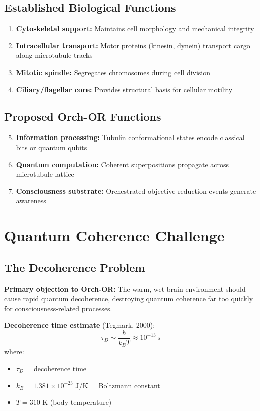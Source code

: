 \subsection{Established Biological Functions}

\begin{enumerate}
\item \textbf{Cytoskeletal support:} Maintains cell morphology and mechanical integrity
\item \textbf{Intracellular transport:} Motor proteins (kinesin, dynein) transport cargo along microtubule tracks
\item \textbf{Mitotic spindle:} Segregates chromosomes during cell division
\item \textbf{Ciliary/flagellar core:} Provides structural basis for cellular motility
\end{enumerate}

\subsection{Proposed Orch-OR Functions}

\begin{enumerate}
\setcounter{enumi}{4}
\item \textbf{Information processing:} Tubulin conformational states encode classical bits or quantum qubits
\item \textbf{Quantum computation:} Coherent superpositions propagate across microtubule lattice
\item \textbf{Consciousness substrate:} Orchestrated objective reduction events generate awareness
\end{enumerate}

\section{Quantum Coherence Challenge}

\subsection{The Decoherence Problem}

\begin{warningbox}
\textbf{Primary objection to Orch-OR:} The warm, wet brain environment should cause rapid quantum decoherence, destroying quantum coherence far too quickly for consciousness-related processes.
\end{warningbox}

\textbf{Decoherence time estimate} (Tegmark, 2000):
\begin{equation}
\label{eq:decoherence-time}
\tau_D \sim \frac{\hbar}{k_B T} \approx 10^{-13}~\text{s}
\end{equation}
where:
\begin{itemize}
\item $\tau_D$ = decoherence time
\item $k_B = 1.381 \times 10^{-23}$ J/K = Boltzmann constant
\item $T = 310$ K (body temperature)
\end{itemize}

